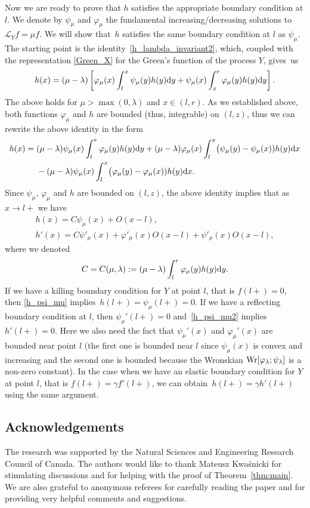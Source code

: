 \documentclass[pdftex]{sigma}
\numberwithin{equation}{section}
\theoremstyle{definition}
\def\L{{\mathcal L}}
\def\wr{{\textnormal{Wr}}}
\def\d{{\textnormal d}}
\begin{document}
Now we are ready to prove that $h$ satisfies the appropriate boundary condition at $l$. We denote by $\psi_{\mu}$ and $\varphi_{\mu}$ the fundamental increasing/decreasing solutions to $\L_Y f = \mu f$. We will show that~$h$ satisfies the same boundary condition at $l$ as $\psi_{\mu}$.
The starting point is the identity~\eqref{h_lambda_invariant2}, which, coupled with the representation \eqref{Green_X} for the Green's function of the process $Y$, gives~us
\[
h(x)=(\mu-\lambda) \left[ \varphi_{\mu}(x) \int_l^x \psi_{\mu}(y) h(y) \d y+ \psi_{\mu}(x) \int_x^r \varphi_{\mu}(y) h(y) \d y \right].
\]
The above holds for $\mu > \max(0,\lambda)$ and $x\in (l,r)$. As we established above, both functions $\varphi_{\mu}$ and $h$ are bounded (thus, integrable) on $(l,z)$, thus we can rewrite the above identity in the form
\begin{align*}
h(x)={}&(\mu-\lambda) \psi_{\mu}(x) \int_l^r \varphi_{\mu}(y) h(y) \d y+ (\mu-\lambda) \varphi_{\mu}(x) \int_l^x \bigl(\psi_{\mu}(y)- \psi_{\mu}(x)) h(y) \d x \\
&- (\mu-\lambda)
\psi_{\mu}(x) \int_l^x \bigl(\varphi_{\mu}(y)- \varphi_{\mu}(x)) h(y) \d x.
\end{align*}
Since $\psi_{\mu}$, $\varphi_{\mu}$ and $h$ are bounded on $(l,z)$, the above identity implies that as $x\to l+$ we have
\begin{gather}
h(x)=C \psi_{\mu}(x) + O(x-l), \label{h_psi_mu}\\
h'(x)=C \psi'_{\mu}(x) + \varphi'_{\mu}(x) O(x-l)+
\psi'_{\mu}(x) O(x-l),\label{h_psi_mu2}
\end{gather}
where we denoted
\[
C=C(\mu,\lambda):=(\mu-\lambda) \int_l^r \varphi_{\mu}(y) h(y) \d y.
\]
If we have a killing boundary condition for $Y$ at point $l$, that is $f(l+)=0$, then \eqref{h_psi_mu} implies~${h(l+)=\psi_{\mu}(l+)=0}$. If we have a reflecting boundary condition at $l$, then $\psi_{\mu}'(l+)=0$ and~\eqref{h_psi_mu2} implies $h'(l+)=0$. Here we also need the fact that $\psi_{\mu}'(x)$ and $\varphi_{\mu}'(x)$ are bounded near point $l$ (the first one is bounded near $l$ since $\psi_{\mu}(x)$ is convex and increasing and the second one is bounded because the Wronskian
$\wr[\varphi_{\lambda}; \psi_{\lambda}]$ is a non-zero constant).
In the case when we have an elastic boundary condition for $Y$ at point $l$, that is $f(l+)=\gamma f'(l+)$, we can obtain~${h(l+)=\gamma h'(l+)}$ using the same argument.

\subsection*{Acknowledgements} The research was supported by the Natural Sciences and Engineering Research Council of
Canada. The authors would like to thank Mateusz Kwa\'snicki for stimulating discussions and for helping with the proof of Theorem~\ref{thm:main}. We are also grateful to anonymous referees for carefully reading the paper and for providing very helpful comments and suggestions.
\end{document}
